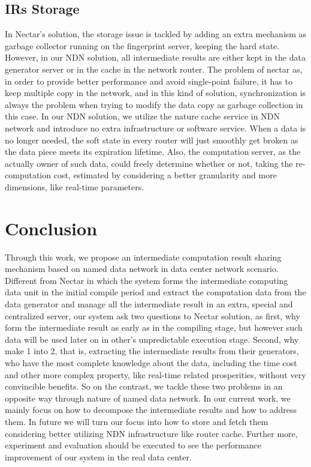 \subsection{IRs Storage}
In Nectar’s solution, the storage issue is tackled by adding an extra mechanism as garbage collector running on the fingerprint server, keeping the hard state. However, in our NDN solution, all intermediate results are either kept in the data generator server or in the cache in the network router. The problem of nectar as, in order to provide better performance and avoid single-point failure, it has to keep multiple copy in the network, and in this kind of solution, synchronization is always the problem when trying to modify the data copy as garbage collection in this case. In our NDN solution, we utilize the nature cache service in NDN network and introduce no extra infrastructure or software service. When a data is no longer needed, the soft state in every router will just smoothly get broken as the data piece meets its expiration lifetime. Also, the computation server, as the actually owner of such data, could freely determine whether or not, taking the re-computation cost, estimated by considering a better granularity and more dimensions, like real-time parameters.

\section{Conclusion}
Through this work, we propose an intermediate computation result sharing mechanism based on named data network in data center network scenario. Different from Nectar in which the system forms the intermediate computing data unit in the initial compile period and extract the computation data from the data generator and manage all the intermediate result in an extra, special and centralized server, our system ask two questions to Nectar solution, as first, why form the intermediate result as early as in the compiling stage, but however such data will be used later on in other’s unpredictable execution stage. Second, why make 1 into 2, that is, extracting the intermediate results from their generators, who have the most complete knowledge about the data, including the time cost and other more complex property, like real-time related prosperities, without very convincible benefits. So on the contrast, we tackle these two problems in an opposite way through nature of named data network. In our current work, we mainly focus on how to decompose the intermediate results and how to address them. In future we will turn our focus into how to store and fetch them considering better utilizing NDN infrastructure like router cache. Further more, experiment and evaluation should be executed to see the performance improvement of our system in the real data center.

